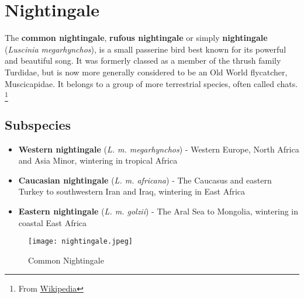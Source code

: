 \documentclass{article}
\begin{document}
\section{Nightingale}

The \textbf{common nightingale}, \textbf{rufous nightingale} or simply \textbf{nightingale} (\textit{Luscinia megarhynchos}), is a small passerine bird best known for its powerful and beautiful song. It was formerly classed as a member of the thrush family Turdidae, but is now more generally considered to be an Old World flycatcher, Muscicapidae. It belongs to a group of more terrestrial species, often called chats. \footnote{From \href{https://en.wikipedia.org/wiki/Common_nightingale}{Wikipedia}}

\subsection{Subspecies}
\begin{itemize}
  \item \textbf{Western nightingale} (\textit{L. m. megarhynchos}) - Western Europe, North Africa and Asia Minor, wintering in tropical Africa
  \item \textbf{Caucasian nightingale} (\textit{L. m. africana}) - The Caucasus and eastern Turkey to southwestern Iran and Iraq, wintering in East Africa
  \item \textbf{Eastern nightingale} (\textit{L. m. golzii}) - The Aral Sea to Mongolia, wintering in coastal East Africa
\end{itemize}

\begin{figure}[htbp]
    \centering
    \texttt{[image: nightingale.jpeg]}
    \caption{Common Nightingale}
    \label{fig:nightingale}
\end{figure}
\end{document}
